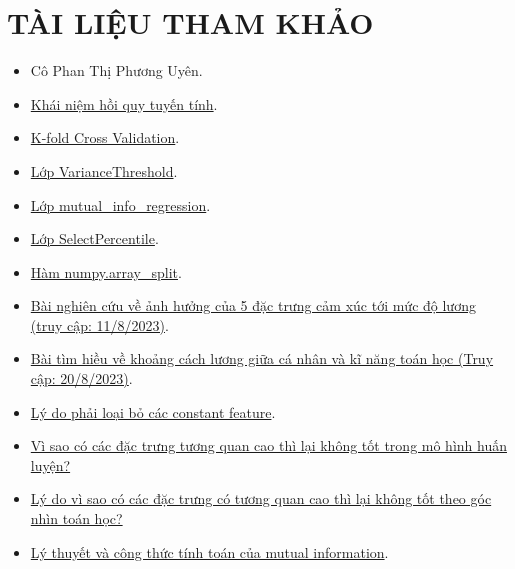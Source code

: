 \documentclass{report}
\begin{document}
\section{TÀI LIỆU THAM KHẢO}
\begin{itemize}
    \item Cô Phan Thị Phương Uyên.
    \item 
    \href{https://en.wikipedia.org/wiki/Linear_regression}{Khái niệm hồi quy tuyến tính}.

    \item
    \href{https://neptune.ai/blog/cross-validation-in-machine-learning-how-to-do-it-right}{K-fold Cross Validation}.

    \item 
    \href{https://scikit-learn.org/stable/modules/generated/sklearn.feature_selection.VarianceThreshold.html}{Lớp VarianceThreshold}.

    \item 
    \href{https://scikit-learn.org/stable/modules/generated/sklearn.feature_selection.mutual_info_regression.html}{Lớp mutual\_info\_regression}.

    \item \href{https://scikit-learn.org/stable/modules/generated/sklearn.feature_selection.SelectPercentile.html}{Lớp SelectPercentile}.

    \item 
    \href{https://numpy.org/doc/stable/reference/generated/numpy.array_split.html#numpy.array_split}{Hàm numpy.array\_split}.

    \item \href{https://kse.ua/kse-research/relationship-between-your-personality-and-your-salary-level/ }{Bài nghiên cứu về ảnh hưởng của 5 đặc trưng cảm xúc tới mức độ lương (truy cập: 11/8/2023)}.

    \item \href{https://www.journals.uchicago.edu/doi/abs/10.1086/298239}{Bài tìm hiều về khoảng cách lương giữa cá nhân và kĩ năng toán học (Truy cập: 20/8/2023)}.

    \item \href{https://sease.io/2021/06/drop-constant-features-a-real-world-ltr-scenario.html#:~:text=Those%20features%20which%20contain%20constant,example%20during%20the%20encoding%20phase}{Lý do phải loại bỏ các constant feature}.
    \item \href{https://datascience.stackexchange.com/questions/24452/in-supervised-learning-why-is-it-bad-to-have-correlated-features}{Vì sao có các đặc trưng tương quan cao thì lại không tốt trong mô hình huấn luyện?}
    \item \href{https://www.quora.com/Why-is-it-important-to-remove-correlated-variables-when-performing-machine-learning-If-2-variables-are-correlated-how-do-you-choose-which-one-to-exclude-from-the-data-set}{Lý do vì sao có các đặc trưng có tương quan cao thì lại không tốt theo góc nhìn toán học?}
    \item \href{https://phamdinhkhanh.github.io/deepai-book/ch_donation/information_theory.html}{Lý thuyết và công thức tính toán của mutual information}.
    

\end{itemize}
\end{document}
